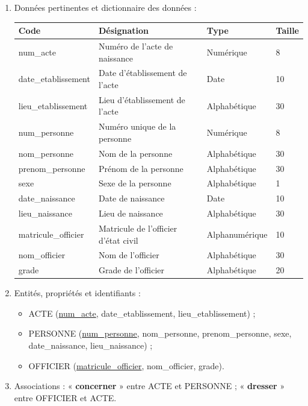 \documentclass[11pt]{article}
\begin{document}
\begin{corrige}
\begin{enumerate}
\item Données pertinentes et dictionnaire des données :
\begin{center}
\begin{tabularx}{\linewidth}{|l|X|l|l|}
\hline
\rowcolor{popblueL} \textbf{Code} & \textbf{Désignation} & \textbf{Type} & \textbf{Taille} \\
\hline
num\_acte & Numéro de l'acte de naissance & Numérique & 8 \\
\hline
date\_etablissement & Date d'établissement de l'acte & Date & 10 \\
\hline
lieu\_etablissement & Lieu d'établissement de l'acte & Alphabétique & 30 \\
\hline
num\_personne & Numéro unique de la personne & Numérique & 8 \\
\hline
nom\_personne & Nom de la personne & Alphabétique & 30 \\
\hline
prenom\_personne & Prénom de la personne & Alphabétique & 30 \\
\hline
sexe & Sexe de la personne & Alphabétique & 1 \\
\hline
date\_naissance & Date de naissance & Date & 10 \\
\hline
lieu\_naissance & Lieu de naissance & Alphabétique & 30 \\
\hline
matricule\_officier & Matricule de l'officier d'état civil & Alphanumérique & 10 \\
\hline
nom\_officier & Nom de l'officier & Alphabétique & 30 \\
\hline
grade & Grade de l'officier & Alphabétique & 20 \\
\hline
\end{tabularx}
\end{center}
\item Entités, propriétés et identifiants :
\begin{itemize}
\item ACTE (\underline{num\_acte}, date\_etablissement, lieu\_etablissement) ;
\item PERSONNE (\underline{num\_personne}, nom\_personne, prenom\_personne, sexe, date\_naissance, lieu\_naissance) ;
\item OFFICIER (\underline{matricule\_officier}, nom\_officier, grade).
\end{itemize}
\item Associations : « \textbf{concerner} » entre ACTE et PERSONNE ; « \textbf{dresser} » entre OFFICIER et ACTE.

\end{enumerate}
\end{corrige}
\end{document}
